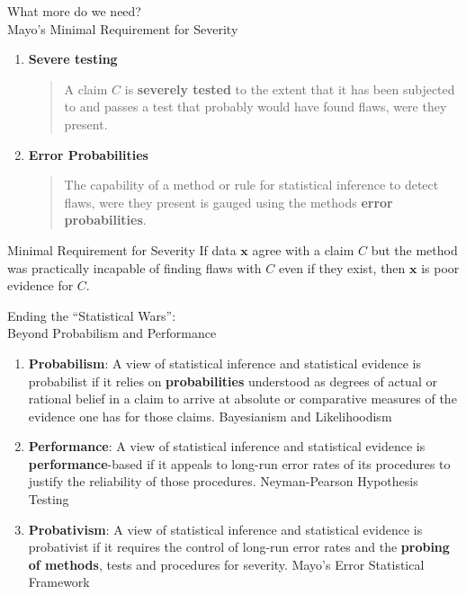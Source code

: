 \documentclass{beamer}
\begin{document}
	\begin{frame}{What more do we need?\\ Mayo's Minimal Requirement for Severity}
	\begin{enumerate}
	\item \textbf{Severe testing}
	
\begin{quote}
A claim $C$ is \textbf{severely tested} to the extent that it has been subjected to and passes a test that probably would have found flaws, were they present.
\end{quote}

	\item \textbf{Error Probabilities}
	
\begin{quote}
	The capability of a method or rule for statistical inference to detect flaws, were they present is gauged using the methods \textbf{error probabilities}.
\end{quote}

	\end{enumerate}
	
	\vfill
	\begin{block}{Minimal Requirement for Severity}
	If data $\textbf{x}$ agree with a claim $C$ but the method was practically incapable of finding flaws with $C$ even if they exist, then $\textbf{x}$ is poor evidence for $C$.
	\end{block}
	
    \end{frame}
    
    \begin{frame}{Ending the ``Statistical Wars'':\\Beyond Probabilism and Performance}
        \begin{enumerate}
        \item \textbf{Probabilism}:
A view of statistical inference and statistical evidence is probabilist if it relies on \textbf{probabilities} understood as degrees of actual or rational belief in a claim to arrive at absolute or comparative measures of the evidence one has for those claims. \alert{Bayesianism and Likelihoodism}
        
        \item \textbf{Performance}:
A view of statistical inference and statistical evidence is \textbf{performance}-based if it appeals to long-run error rates of its procedures to justify the reliability of those procedures. \alert{Neyman-Pearson Hypothesis Testing}
        
        \item \textbf{Probativism}:
 A view of statistical inference and statistical evidence is probativist if it requires the control of long-run error rates and the \textbf{probing of methods}, tests and procedures for severity. \alert{Mayo's Error Statistical Framework}
        \end{enumerate}
	\end{frame}
	
\end{document}
